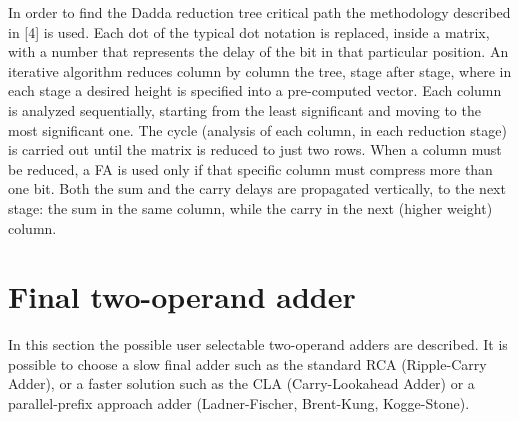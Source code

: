 \documentclass[11pt]{article} %
\begin{document}
\vspace{1em}
In order to find the Dadda reduction tree critical path the methodology described in [4] is used. Each dot of the typical dot notation is replaced, inside a matrix, with a number that represents the delay of the bit in that particular position.
An iterative algorithm reduces column by column the tree, stage after stage, where in each stage a desired height is specified into a pre-computed vector. Each column is analyzed sequentially,
starting from the least significant and moving to the most significant one. The cycle (analysis of each column, in each reduction stage) is carried out
until the matrix is reduced to just two rows.
When a column must be reduced, a FA is used only if that specific column must compress more than one bit. Both the sum and the carry delays are propagated vertically, to the next stage: the sum
in the same column, while the carry in the next (higher weight) column.
\newpage
\section{Final two-operand adder}
In this section the possible user selectable two-operand adders are described. It is possible to choose a slow final adder such as the standard RCA (Ripple-Carry Adder), or a faster solution such as the CLA (Carry-Lookahead Adder) or a parallel-prefix approach adder (Ladner-Fischer, Brent-Kung, Kogge-Stone).
\vspace{1em}
\end{document}
